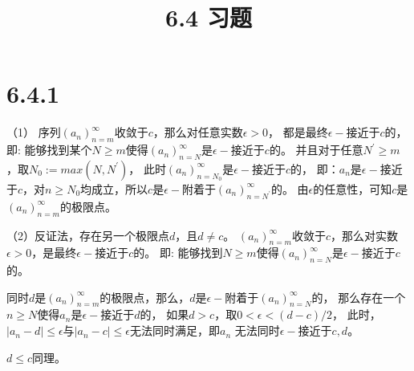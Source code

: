 \documentclass{article}
\theoremstyle{mystyle}
\begin{document}
\title{6.4 习题}
\maketitle

\section*{6.4.1}

（1）
序列$(a_n)_{n=m}^\infty$收敛于$c$，那么对任意实数$\epsilon > 0$，
都是最终$\epsilon -$接近于$c$的，
即: 能够找到某个$N \geq m$使得$(a_n)_{n=N}^\infty$是$\epsilon-$接近于$c$的。
并且对于任意$N^\prime \geq m$，取$N_0 := max(N, N^\prime)$，
此时$(a_n)_{n=N_0}^\infty$是$\epsilon-$接近于$c$的，
即：$a_n$是$\epsilon-$接近于$c$，对$n \geq N_0$均成立，所以$c$是$\epsilon-$附着于$(a_n)_{n=N^\prime}^\infty$的。
由$\epsilon$的任意性，可知$c$是$(a_n)_{n=m}^\infty$的极限点。

（2）反证法，存在另一个极限点$d$，且$d \neq c$。
$(a_n)_{n=m}^\infty$收敛于$c$，那么对实数$\epsilon > 0$，是最终$\epsilon -$接近于$c$的。
即: 能够找到$N \geq m$使得$(a_n)_{n=N}^\infty$是$\epsilon-$接近于$c$的。

同时$d$是$(a_n)_{n=m}^\infty$的极限点，那么，$d$是$\epsilon-$附着于$(a_n)_{n=N}^\infty$的，
那么存在一个$n \geq N$使得$a_n$是$\epsilon-$接近于$d$的，
如果$d > c$，取$0 <\epsilon < (d-c)/2$，
此时，$|a_n - d| \leq \epsilon$与$|a_n - c| \leq \epsilon$无法同时满足，即$a_n$
无法同时$\epsilon-$接近于$c,d$。

$d \leq c$同理。
\end{document}
